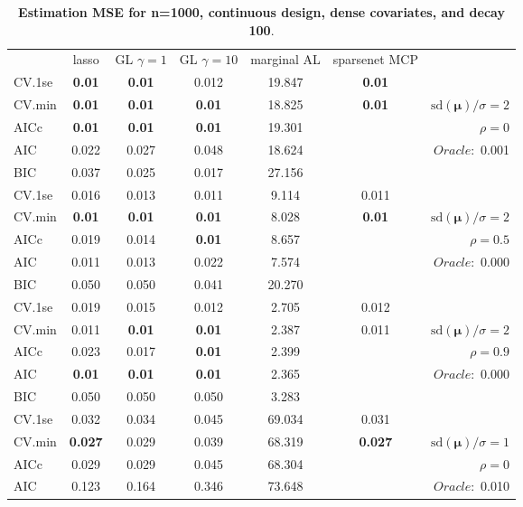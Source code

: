 \clearpage
\begin{table}\vspace{-.5cm}
\caption[l]{ { \bf Estimation MSE for n=1000, continuous design, 
dense covariates, and  decay  100}.}
\vspace{-.5cm}
\footnotesize{}
\begin{center}
\begin{tabular}{l*{5}{c}|r}
& lasso & GL $\gamma=1$ & GL $\gamma=10$ & marginal AL & sparsenet MCP  & \\
 \cline{1-7}
CV.1se & {\bf 0.01} & {\bf 0.01} & 0.012 & 19.847 & {\bf 0.01} & \\
CV.min & {\bf 0.01} & {\bf 0.01} & {\bf 0.01} & 18.825 & {\bf 0.01} &  $\mathrm{sd}(\mathbf{\mu})/\sigma=2$ \\
AICc & {\bf 0.01} & {\bf 0.01} & {\bf 0.01} & 19.301 & & $\rho=0$ \\
AIC & 0.022 & 0.027 & 0.048 & 18.624 & &  \multirow{2}{*}{$Oracle: $ 0.001} \\
BIC & 0.037 & 0.025 & 0.017 & 27.156 & &  \\
 \hline 
CV.1se & 0.016 & 0.013 & 0.011 & 9.114 & 0.011 & \\
CV.min & {\bf 0.01} & {\bf 0.01} & {\bf 0.01} & 8.028 & {\bf 0.01} &  $\mathrm{sd}(\mathbf{\mu})/\sigma=2$ \\
AICc & 0.019 & 0.014 & {\bf 0.01} & 8.657 & & $\rho=0.5$ \\
AIC & 0.011 & 0.013 & 0.022 & 7.574 & &  \multirow{2}{*}{$Oracle: $ 0.000} \\
BIC & 0.050 & 0.050 & 0.041 & 20.270 & &  \\
 \hline 
CV.1se & 0.019 & 0.015 & 0.012 & 2.705 & 0.012 & \\
CV.min & 0.011 & {\bf 0.01} & {\bf 0.01} & 2.387 & 0.011 &  $\mathrm{sd}(\mathbf{\mu})/\sigma=2$ \\
AICc & 0.023 & 0.017 & {\bf 0.01} & 2.399 & & $\rho=0.9$ \\
AIC & {\bf 0.01} & {\bf 0.01} & {\bf 0.01} & 2.365 & &  \multirow{2}{*}{$Oracle: $ 0.000} \\
BIC & 0.050 & 0.050 & 0.050 & 3.283 & &  \\
 \hline 
CV.1se & 0.032 & 0.034 & 0.045 & 69.034 & 0.031 & \\
CV.min & {\bf 0.027} & 0.029 & 0.039 & 68.319 & {\bf 0.027} &  $\mathrm{sd}(\mathbf{\mu})/\sigma=1$ \\
AICc & 0.029 & 0.029 & 0.045 & 68.304 & & $\rho=0$ \\
AIC & 0.123 & 0.164 & 0.346 & 73.648 & &  \multirow{2}{*}{$Oracle: $ 0.010} \\

\end{tabular}
\end{center}
\end{table}
